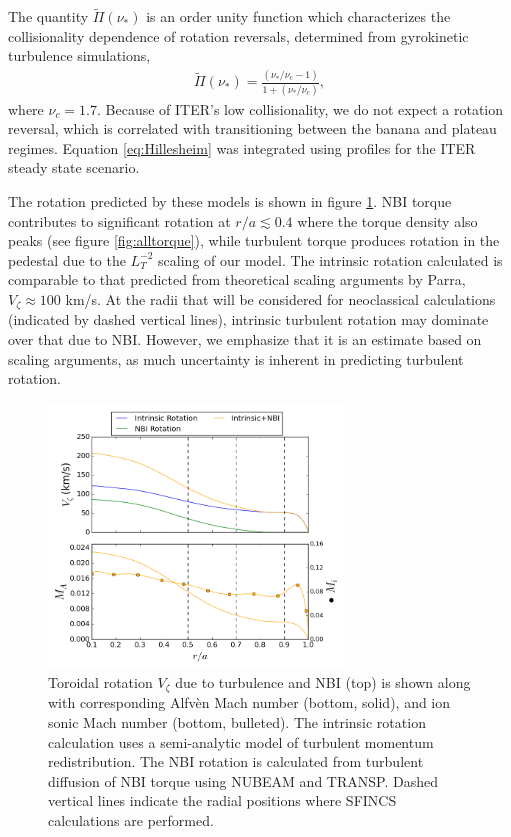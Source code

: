 \documentclass[aip, pop, preprint]{revtex4-1}
\numberwithin{figure}{section}
\numberwithin{equation}{section}
\begin{document}
The quantity $\widetilde{\Pi} (\nu_*)$ is an order unity function which characterizes the collisionality dependence of rotation reversals, determined from gyrokinetic turbulence simulations,\cite{Barnes2013}
\begin{gather}
\widetilde{\Pi} (\nu_*) = \frac{(\nu_*/\nu_c -1)}{1 + (\nu_*/\nu_c)},
\end{gather}
where $\nu_c = 1.7$. Because of ITER's low collisionality, we do not expect a rotation reversal, which is correlated with transitioning between the banana and plateau regimes. Equation \ref{eq:Hillesheim} was integrated using profiles for the ITER steady state scenario. 

The rotation predicted by these models is shown in figure \ref{fig:rotation_estimate}. NBI torque contributes to significant rotation at $r/a \lesssim 0.4$ where the torque density also peaks (see figure \ref{fig:alltorque}), while turbulent torque produces rotation in the pedestal due to the $L_T^{-2}$ scaling of our model.  The intrinsic rotation calculated is comparable to that predicted from theoretical scaling arguments by Parra,\cite{Parra2012} $V_{\zeta} \approx 100$ km/s. At the radii that will be considered for neoclassical calculations (indicated by dashed vertical lines), intrinsic turbulent rotation may dominate over that due to NBI. However, we emphasize that it is an estimate based on scaling arguments, as much uncertainty is inherent in predicting turbulent rotation. 

\FloatBarrier

\begin{figure}[h!]
\centering
\includegraphics[width=0.7\textwidth]{rotationestimate.png}
\caption{\label{fig:rotation_estimate} Toroidal rotation $V_{\zeta}$ due to turbulence and NBI (top) is shown along with  corresponding Alfv\`{e}n Mach number (bottom, solid), and ion sonic Mach number (bottom, bulleted). The intrinsic rotation calculation uses a semi-analytic model of turbulent momentum redistribution.\cite{Hillesheim2015} The NBI rotation is calculated from turbulent diffusion of NBI torque using NUBEAM and TRANSP.\cite{Poli2014} Dashed vertical lines indicate the radial positions where SFINCS calculations are performed. }
\end{figure}
\end{document}
